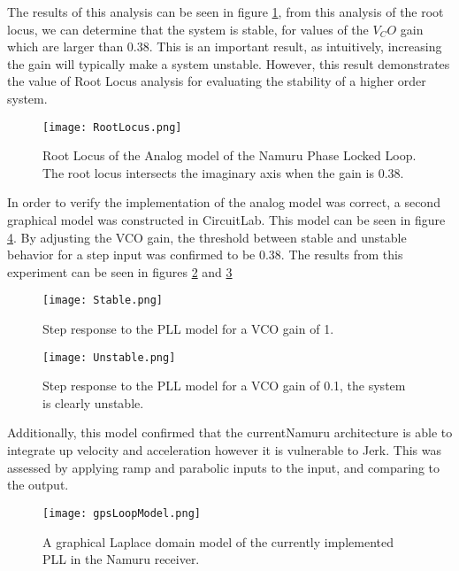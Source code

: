 The results of this analysis can be seen in figure \ref{fig:RootLocus}, from this analysis of the root locus, we can determine  that the system is stable, for values of the $V_CO$ gain which are larger than 0.38. This is an important result, as intuitively, increasing the gain will typically make a system unstable. However, this result demonstrates the value of Root Locus analysis for evaluating the stability of a higher order system.

\begin{figure}[!htb] 
    \centering
    \texttt{[image: RootLocus.png]} 
    \caption{Root Locus of the Analog model of the Namuru Phase Locked Loop. The root locus intersects the imaginary axis when the gain is 0.38.}
    \label{fig:RootLocus}
\end{figure}


In order to verify the implementation of the analog model was correct, a second graphical model was constructed in CircuitLab. This model can be seen in figure \ref{fig:gpsLoopModel}. By adjusting the VCO gain, the threshold between stable and unstable behavior for a step input was confirmed to be 0.38. The results from this experiment can be seen in figures \ref{fig:Stable} and \ref{fig:Unstable}

\begin{figure}[!htb] 
    \centering
    \texttt{[image: Stable.png]} 
    \caption{Step response to the \ac{PLL} model for a VCO gain of 1.}
    \label{fig:Stable}
\end{figure}

\begin{figure}[!htb] 
    \centering
    \texttt{[image: Unstable.png]} 
    \caption{Step response to the \ac{PLL} model for a VCO gain of 0.1, the system is clearly unstable.}
    \label{fig:Unstable}
\end{figure}

Additionally, this model confirmed that the currentNamuru architecture is able to integrate up velocity and acceleration however it is vulnerable to Jerk. This was assessed by applying ramp and parabolic inputs to the input, and comparing to the output.

\begin{figure}[!htb] 
    \centering
    \texttt{[image: gpsLoopModel.png]} 
    \caption{A graphical Laplace domain model of the currently implemented \ac{PLL} in the Namuru receiver.}
    \label{fig:gpsLoopModel}
\end{figure}

